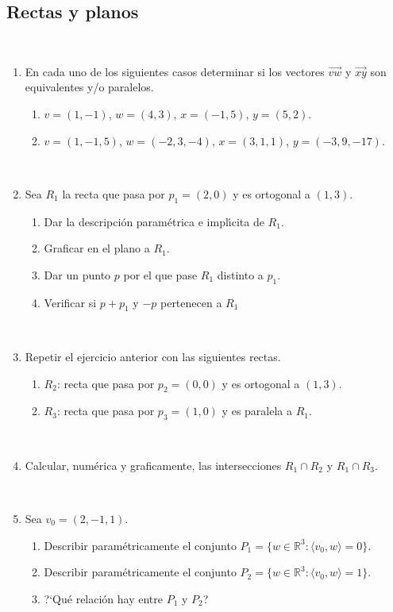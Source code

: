 \documentclass[a4paper,12pt,twoside,spanish,reqno]{amsbook}
\numberwithin{equation}{section}
\begin{document}
\subsection*{Rectas y planos}

\


\begin{enumerate}[resume]

\item En  cada uno de los siguientes casos determinar si los
vectores  $\overrightarrow{vw}$ y $\overrightarrow{xy}$ son
equivalentes y/o paralelos.
\begin{enumerate}
\item   $v=(1,-1)$,  $w=(4,3)$, $x=(-1,5)$, $y=(5,2)$.
\item   $v=(1,-1,5)$,  $w=(-2,3,-4)$,  $x=(3,1,1)$,  $y=(-3,9,-17)$.
\end{enumerate}

\

\item Sea $R_1$ la recta que pasa por $p_1=(2,0)$ y es ortogonal a $(1,3)$.
\begin{enumerate}
 \item Dar la descripci\'on param{\'e}trica e impl{\'\i}cita de $R_1$.
 \item Graficar en el plano a $R_1$.
 \item Dar un punto $p$ por el que pase $R_1$ distinto a $p_1$.
 \item Verificar si $p+p_1$ y $-p$ pertenecen a $R_1$
\end{enumerate}

\

\item Repetir el ejercicio anterior con las siguientes rectas.
\begin{enumerate}
	\item
	$R_2$: recta que pasa por $p_2=(0,0)$ y es ortogonal a $(1,3)$.
	\item
	$R_3$: recta que pasa por $p_3=(1,0)$ y es paralela a $R_1$.
\end{enumerate}

\

\item Calcular, num\'erica y graficamente, las intersecciones $R_1\cap R_2$ y $R_1\cap R_3$.

\

\item Sea $v_0=(2,-1,1)$.
\begin{enumerate}
	\item Describir param{\'e}tricamente el conjunto
	$P_1=\{w\in\mathbb{ R}^3:\langle v_0 , w  \rangle=0\}$.
	\item Describir param{\'e}tricamente el conjunto
	$P_2=\{w\in\mathbb{ R}^3:\langle v_0 , w  \rangle=1\}$.
	\item ?`Qu\'e relaci\'on hay entre $P_1$ y $P_2$?
\end{enumerate}


\end{enumerate}
\end{document}

